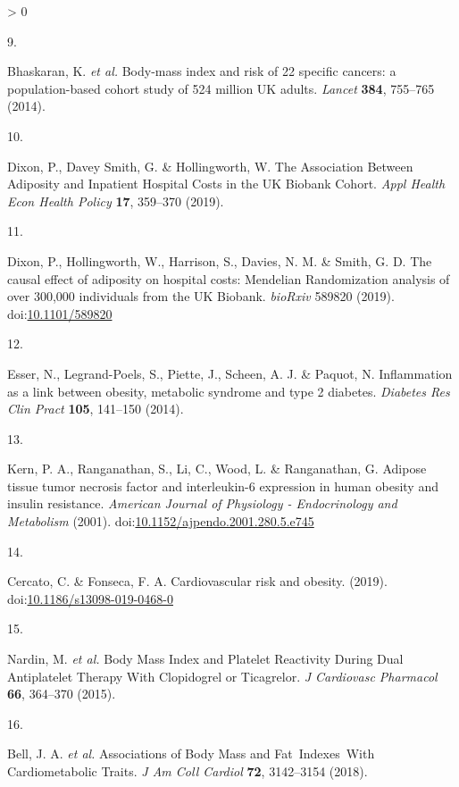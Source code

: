 \documentclass[11pt,twoside]{bristolthesis}
\newlength{\cslhangindent}
\newlength{\csllabelwidth}
\newenvironment{CSLReferences}[2] %
 {%
  \setlength{\parindent}{0pt}
  \ifodd #1 \everypar{\setlength{\hangindent}{\cslhangindent}}\ignorespaces\fi
  \ifnum #2 > 0
  \setlength{\parskip}{#2\baselineskip}
  \fi
 }%
 {}
\newcommand{\CSLLeftMargin}[1]{\parbox[t]{\csllabelwidth}{#1}}
\newcommand{\CSLRightInline}[1]{\parbox[t]{\linewidth - \csllabelwidth}{#1}\break}
\begin{document}
\begin{CSLReferences}{0}{0}
\leavevmode\hypertarget{ref-Bhaskaran2014}{}%
\CSLLeftMargin{9. }
\CSLRightInline{Bhaskaran, K. \emph{et al.} {Body-mass index and risk of 22 specific cancers: a population-based cohort study of 5{{}}24 million UK adults}. \emph{Lancet} \textbf{384}, 755--765 (2014).}

\leavevmode\hypertarget{ref-Dixon2019a}{}%
\CSLLeftMargin{10. }
\CSLRightInline{Dixon, P., Davey Smith, G. \& Hollingworth, W. {The Association Between Adiposity and Inpatient Hospital Costs in the UK Biobank Cohort}. \emph{Appl Health Econ Health Policy} \textbf{17}, 359--370 (2019).}

\leavevmode\hypertarget{ref-Dixon2019}{}%
\CSLLeftMargin{11. }
\CSLRightInline{Dixon, P., Hollingworth, W., Harrison, S., Davies, N. M. \& Smith, G. D. {The causal effect of adiposity on hospital costs: Mendelian Randomization analysis of over 300,000 individuals from the UK Biobank}. \emph{bioRxiv} 589820 (2019). doi:\href{https://doi.org/10.1101/589820}{10.1101/589820}}

\leavevmode\hypertarget{ref-Esser2014}{}%
\CSLLeftMargin{12. }
\CSLRightInline{Esser, N., Legrand-Poels, S., Piette, J., Scheen, A. J. \& Paquot, N. {Inflammation as a link between obesity, metabolic syndrome and type 2 diabetes}. \emph{Diabetes Res Clin Pract} \textbf{105}, 141--150 (2014).}

\leavevmode\hypertarget{ref-Kern2001}{}%
\CSLLeftMargin{13. }
\CSLRightInline{Kern, P. A., Ranganathan, S., Li, C., Wood, L. \& Ranganathan, G. {Adipose tissue tumor necrosis factor and interleukin-6 expression in human obesity and insulin resistance}. \emph{American Journal of Physiology - Endocrinology and Metabolism} (2001). doi:\href{https://doi.org/10.1152/ajpendo.2001.280.5.e745}{10.1152/ajpendo.2001.280.5.e745}}

\leavevmode\hypertarget{ref-Cercato2019}{}%
\CSLLeftMargin{14. }
\CSLRightInline{Cercato, C. \& Fonseca, F. A. {Cardiovascular risk and obesity}. (2019). doi:\href{https://doi.org/10.1186/s13098-019-0468-0}{10.1186/s13098-019-0468-0}}

\leavevmode\hypertarget{ref-Nardin2015}{}%
\CSLLeftMargin{15. }
\CSLRightInline{Nardin, M. \emph{et al.} {Body Mass Index and Platelet Reactivity During Dual Antiplatelet Therapy With Clopidogrel or Ticagrelor}. \emph{J Cardiovasc Pharmacol} \textbf{66}, 364--370 (2015).}

\leavevmode\hypertarget{ref-Bell2018a}{}%
\CSLLeftMargin{16. }
\CSLRightInline{Bell, J. A. \emph{et al.} {Associations of Body Mass and Fat~Indexes~With Cardiometabolic Traits}. \emph{J Am Coll Cardiol} \textbf{72}, 3142--3154 (2018).}


\end{CSLReferences}
\end{document}
